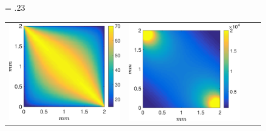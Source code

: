 \documentclass[final,5p,times,twocolumn]{elsarticle}
\begin{document}
\begin{figure}[]
	\centering
	\fwd = .23\textwidth
	\begin{tabular}{c c c c}
		\includegraphics[width=\fwd]{figs/E110_CBFOnDifferentResolutions_plot-Ps-scaleto-none-raw.eps} 
		& \includegraphics[width=\fwd]{figs/E110_CBFOnDifferentResolutions_plot-Pv-scaleto-none-raw.eps}

\end{tabular}
\end{figure}
\end{document}
